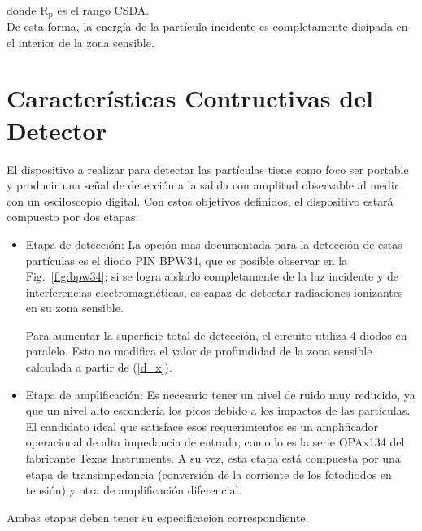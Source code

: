 \documentclass[a4paper,conference]{IEEEtran}
\begin{document}
        \hfill \\ donde $\mathrm{R_{p}}$ es el rango CSDA.\\
        De esta forma, la energía de la partícula incidente es completamente
        disipada en el interior de la zona sensible.

    \section{Características Contructivas del Detector}
        El dispositivo a realizar para detectar las partículas tiene como foco
        ser portable y producir una señal de detección a la salida con amplitud
        observable al medir con un osciloscopio digital. Con estos objetivos
        definidos, el dispositivo estará compuesto por dos etapas:
        \begin{itemize}
            \item Etapa de detección: La opción mas documentada para la
                detección de estas partículas es el diodo PIN BPW34, que es
                posible observar en la Fig.~\ref{fig:bpw34}; si se logra
                aislarlo completamente de la luz incidente y de interferencias
                electromagnéticas, es capaz de detectar radiaciones ionizantes
                en su zona sensible.\par
                Para aumentar la superficie total de detección, el circuito
                utiliza 4 diodos en paralelo. Esto no modifica el valor de
                profundidad de la zona sensible calculada a partir de
                (\ref{d_x}).
            \item Etapa de amplificación: Es necesario tener un nivel de ruido
                muy reducido, ya que un nivel alto escondería los picos debido a
                los impactos de las partículas. El candidato ideal que satisface
                esos requerimientos es un amplificador operacional de alta
                impedancia de entrada, como lo es la serie OPAx134 del
                fabricante Texas Instruments. A su vez, esta etapa está
                compuesta por una etapa de transimpedancia (conversión de la
                corriente de los fotodiodos en tensión) y otra de amplificación
                diferencial.
        \end{itemize}

        Ambas etapas deben tener su especificación correspondiente.
\end{document}
